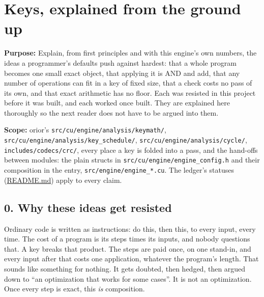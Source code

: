 \chapter{\texorpdfstring{Keys, explained from the ground up}{Keys, explained from the ground up}}
\label{chap:keys-explained}

\textbf{Purpose:} Explain, from first principles and with this engine's own numbers, the ideas a programmer's defaults push against hardest: that a whole program becomes one small exact object, that applying it is AND and add, that any number of operations can fit in a key of fixed size, that a check costs no pass of its own, and that exact arithmetic has no floor. Each was resisted in this project before it was built, and each worked once built. They are explained here thoroughly so the next reader does not have to be argued into them.

\textbf{Scope:} orior's \texttt{src/\allowbreak{}cu/\allowbreak{}engine/\allowbreak{}analysis/\allowbreak{}keymath/\allowbreak{}}, \texttt{src/\allowbreak{}cu/\allowbreak{}engine/\allowbreak{}analysis/\allowbreak{}key\_\allowbreak{}schedule/\allowbreak{}}, \texttt{src/\allowbreak{}cu/\allowbreak{}engine/\allowbreak{}analysis/\allowbreak{}cycle/\allowbreak{}}, \texttt{includes/\allowbreak{}codecs/\allowbreak{}crc/\allowbreak{}}, every place a key is folded into a pass, and the hand-offs between modules: the plain structs in \texttt{src/\allowbreak{}cu/\allowbreak{}engine/\allowbreak{}engine\_\allowbreak{}config.\allowbreak{}h} and their composition in the entry, \texttt{src/\allowbreak{}engine/\allowbreak{}engine\_\allowbreak{}*.\allowbreak{}cu}. The ledger's statuses (\hyperref[chap:readme]{README.md}) apply to every claim.

\section{\texorpdfstring{0. Why these ideas get resisted}{0. Why these ideas get resisted}}

Ordinary code is written as instructions: do this, then this, to every input, every time. The cost of a program is its steps times its inputs, and nobody questions that. A key breaks that product. The steps are paid once, on one stand-in, and every input after that costs one application, whatever the program's length. That sounds like something for nothing. It gets doubted, then hedged, then argued down to “an optimization that works for some cases”. It is not an optimization. Once every step is exact, this \emph{is} composition.


